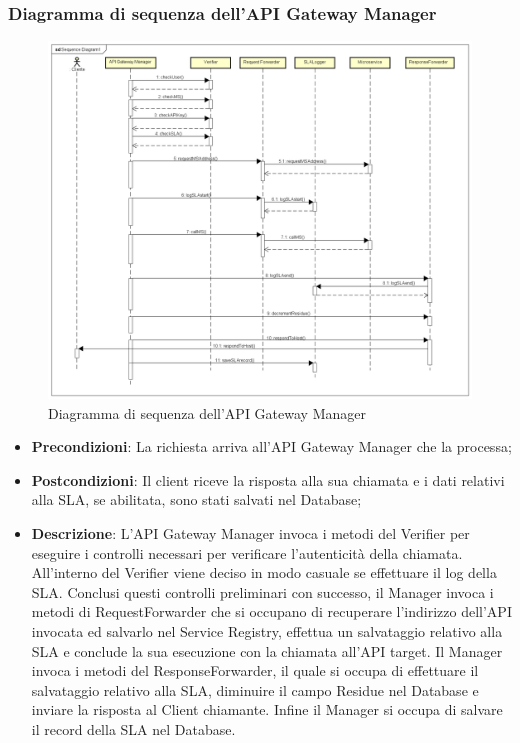 \newpage
\subsubsection{Diagramma di sequenza dell'API Gateway Manager}
\begin{figure}[h]
	\centering
	\includegraphics[width=1.0\linewidth]{"IMG/Sequence Diagram1"}
	\caption{Diagramma di sequenza dell'API Gateway Manager}
\end{figure}


\begin{itemize}
	\item \textbf{Precondizioni}: La richiesta arriva all'API Gateway Manager che la processa;
	\item \textbf{Postcondizioni}: Il client riceve la risposta alla sua chiamata e i dati relativi alla SLA, se abilitata, sono stati salvati nel Database;
	\item \textbf{Descrizione}: L'API Gateway Manager invoca i metodi del Verifier per eseguire i controlli necessari per verificare l'autenticità della chiamata. All'interno del Verifier viene deciso in modo casuale se effettuare il log della SLA.
	Conclusi questi controlli preliminari con successo, il Manager invoca i metodi di RequestForwarder che si occupano di recuperare l'indirizzo dell'API invocata ed salvarlo nel Service Registry, effettua un salvataggio relativo alla SLA e conclude la sua esecuzione con la chiamata all'API target. Il Manager invoca i metodi del ResponseForwarder, il quale si occupa di effettuare il salvataggio relativo alla SLA, diminuire il campo Residue nel Database e inviare la risposta al Client chiamante. Infine il Manager si occupa di salvare il record della SLA nel Database.  
\end{itemize}
